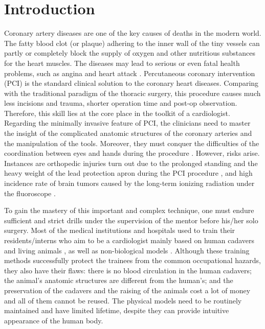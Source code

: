 
\section{Introduction}
\label{sec4_1}

Coronary artery diseases are one of the key causes of deaths in the modern world. %
The fatty blood clot (or plaque) adhering to the inner wall of the tiny vessels can partly or completely block the supply of oxygen and other nutritious substances for the heart muscles.
The diseases may lead to serious or even fatal health problems, such as angina and heart attack \cite{OCallaghan2002}.
Percutaneous coronary intervention (PCI) is the standard clinical solution to the coronary heart diseases.
Comparing with the traditional paradigm of the thoracic surgery, this procedure causes much less incisions and trauma, shorter operation time and post-op observation.
Therefore, this skill lies at the core place in the toolkit of a cardiologist.
Regarding the minimally invasive feature of PCI, the clinicians need to master the insight of the complicated anatomic structures of the coronary arteries and the manipulation of the tools.
Moreover, they must conquer the difficulties of the coordination between eyes and hands during the procedure \cite{Li2012CUHK}.
However, risks arise.
Instances are orthopedic injuries turn out due to the prolonged standing and the heavy weight of the lead protection apron during the PCI procedure \cite{Goldstein2004}, and high incidence rate of brain tumors caused by the long-term ionizing radiation under the fluoroscope \cite{Roguin2012}.

To gain the mastery of this important and complex technique, one must endure sufficient and strict drills under the supervision of the mentor before his/her solo surgery.
Most of the medical institutions and hospitals used to train their residents/interns who aim to be a cardiologist mainly based on human cadavers and living animals \cite{Lunderquist1995}, as well as non-biological models \cite{Mori1998}.
Although these training methods successfully protect the trainees from the common occupational hazards, they also have their flaws:
there is no blood circulation in the human cadavers;
the animal's anatomic structures are different from the human's;
and the preservation of the cadavers and the raising of the animals cost a lot of money and all of them cannot be reused.
The physical models need to be routinely maintained and have limited lifetime, despite they can provide intuitive appearance of the human body.

